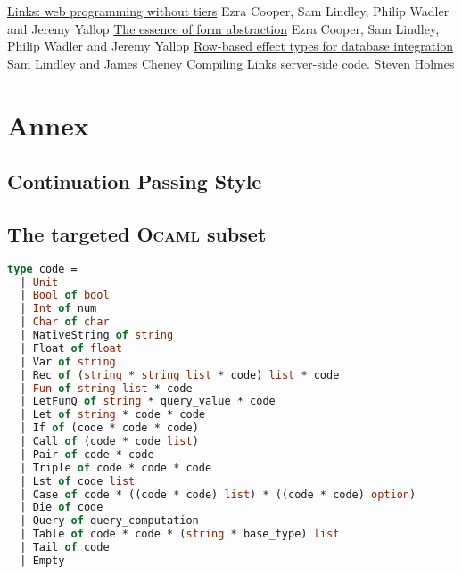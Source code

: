 \documentclass[11pt]{article}
\newcommand\mysc[1]{{\rmfamily\textsc{#1}}\xspace}
\newcommand\ocaml{\mysc{Ocaml}}
\begin{document}
\begin{thebibliography}{99}
 \href{http://groups.inf.ed.ac.uk/links/papers/links-fmco06.pdf}{Links: web programming without tiers} Ezra Cooper, Sam Lindley, Philip Wadler and Jeremy Yallop
 \href{http://groups.inf.ed.ac.uk/links/papers/formlets-essence.pdf}{The essence of form abstraction} Ezra Cooper, Sam Lindley, Philip Wadler and Jeremy Yallop
 \href{http://homepages.inf.ed.ac.uk/slindley/papers/corelinks.pdf}{Row-based effect types for database integration} Sam Lindley and James Cheney
 \href{http://groups.inf.ed.ac.uk/links/papers/undergrads/steven.pdf}{Compiling Links server-side code}. Steven Holmes
\end{thebibliography}

\section*{Annex}

\subsection*{Continuation Passing Style\label{cps}}

\subsection*{The targeted \ocaml subset\label{ocamlsubset}}
\begin{lstlisting}[language=ML]
type code =
  | Unit
  | Bool of bool
  | Int of num
  | Char of char
  | NativeString of string
  | Float of float
  | Var of string
  | Rec of (string * string list * code) list * code
  | Fun of string list * code 
  | LetFunQ of string * query_value * code
  | Let of string * code * code
  | If of (code * code * code)
  | Call of (code * code list)
  | Pair of code * code
  | Triple of code * code * code
  | Lst of code list
  | Case of code * ((code * code) list) * ((code * code) option)
  | Die of code
  | Query of query_computation
  | Table of code * code * (string * base_type) list
  | Tail of code
  | Empty
\end{lstlisting}
\end{document}
